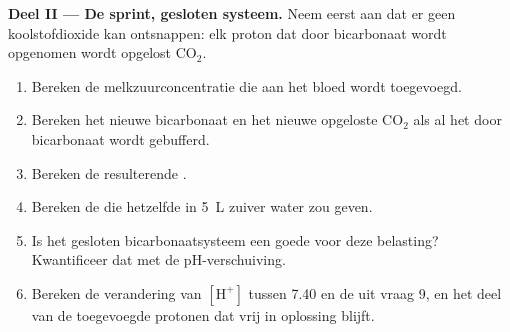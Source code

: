 \begin{problem}
\medskip
\noindent\textbf{Deel II --- De sprint, gesloten systeem.}
Neem eerst aan dat er geen koolstofdioxide kan ontsnappen: elk proton dat door
bicarbonaat wordt opgenomen wordt opgelost $\mathrm{CO_2}$.
\begin{enumerate}[resume]
  \item Bereken de melkzuurconcentratie die aan het bloed wordt
        toegevoegd.
  \item Bereken het nieuwe bicarbonaat en het nieuwe opgeloste
        $\mathrm{CO_2}$ als al het  door bicarbonaat wordt gebufferd.
  \item Bereken de resulterende .
  \item Bereken de  die hetzelfde  in \qty{5}{L} zuiver water zou
        geven.
  \item Is het gesloten bicarbonaatsysteem een goede  voor deze
        belasting? Kwantificeer dat met de pH-verschuiving.
  \item Bereken de verandering van $[\mathrm{H^+}]$ tussen  7.40 en de
         uit vraag 9, en het deel van de toegevoegde protonen dat vrij
        in oplossing blijft.
\end{enumerate}


\end{problem}
